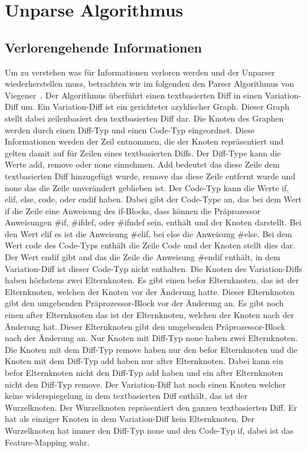 \chapter{Unparse Algorithmus}
\section{Verlorengehende Informationen}

Um zu verstehen was für Informationen verloren werden und der Unparser wiederherstellen muss, betrachten wir im folgenden den Parser Algorithmus von Viegener~\cite{Viegener21}. Der Algorithmus überführt einen textbasierten Diff in einen Variation-Diff um. Ein Variation-Diff ist ein gerichteter azyklischer Graph. Dieser Graph stellt dabei zeilenbasiert den textbasierten Diff dar. Die Knoten des Graphen werden durch einen Diff-Typ und einen Code-Typ eingeordnet. Diese Informationen werden der Zeil entnommen, die der Knoten repräsentiert und gelten damit auf für Zeilen eines textbasierten Diffs. Der Diff-Type kann die Werte add, remove oder none einnehmen. Add bedeutet das diese Zeile dem textbasierten Diff hinzugefügt wurde, remove das diese Zeile entfernt wurde und none das die Zeile unverändert geblieben ist. Der Code-Typ kann die Werte if, elif, else, code, oder endif haben. Dabei gibt der Code-Type an, das bei dem Wert if die Zeile eine Anweisung des if-Blocks, dass können die Präprozessor Anweisungen \#if, \#ifdef, oder \#ifndef sein, enthält und der Knoten darstellt. Bei den Wert elif es ist die Anweisung \#elif, bei else die Anweisung \#else. Bei dem Wert code des Code-Typs enthält die Zeile Code und der Knoten stellt dies dar. Der Wert endif gibt and das die Zeile die Anweisung \#endif enthält, in dem Variation-Diff ist dieser Code-Typ nicht enthalten. Die Knoten des Variation-Diffs haben höchstens zwei Elternknoten. Es gibt einen befor Elternknoten, das ist der Elternknoten, welchen der Knoten vor der Änderung hatte. Dieser Elternknoten gibt den umgebenden Präprozessor-Block vor der Änderung an. Es gibt noch einen after Elternknoten das ist der Elternknoten, welchen der Knoten nach der Änderung hat. Dieser Elternknoten gibt den umgebenden Präprozessor-Block nach der Änderung an. Nur Knoten mit Diff-Typ none haben zwei Elternknoten. Die Knoten mit dem Diff-Typ remove haben nur den befor Elternknoten und die Knoten mit dem Diff-Typ add haben nur after Elternknoten. Dabei kann ein befor Elternknoten nicht den Diff-Typ add haben und ein after Elternknoten nicht den Diff-Typ remove. Der Variation-Diff hat noch einen Knoten welcher keine widerspiegelung in dem textbasierten Diff enthält, das ist der Wurzelknoten. Der Wurzelknoten repräsentiert den ganzen textbasierten Diff. Er hat als einziger Knoten in dem Variation-Diff kein Elternknoten. Der Wurzelknoten hat immer den Diff-Typ none und den Code-Typ if, dabei ist das Feature-Mapping wahr.



